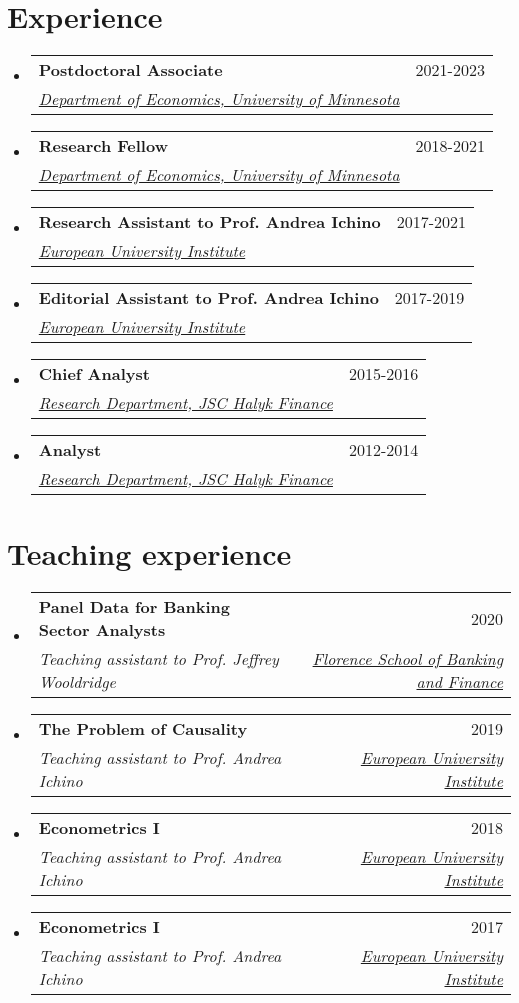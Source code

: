 \documentclass[a4, 11pt]{article}
\makeatletter
\newcommand{\resumeSubheading}[4]{
      \vspace{-2pt}\item
        \begin{tabular*}{0.97\textwidth}[t]{l@{\extracolsep{\fill}}r}
          \textbf{#1} & #2 \\
          \textit{\small#3} & \textit{\small #4} \\
        \end{tabular*}
    }
\newcommand{\resumeSubHeadingListStart}{\begin{itemize}[leftmargin=0.15in, label={}]}
\newcommand{\resumeSubHeadingListEnd}{\end{itemize}}
\makeatother
\begin{document}
    \section{Experience}
  \resumeSubHeadingListStart
        \resumeSubheading
          {Postdoctoral Associate}
          {2021-2023}
          {\href{https://cla.umn.edu/economics}{Department of Economics, University of Minnesota} }
          {}
        \resumeSubheading
          {Research Fellow}
          {2018-2021}
          {\href{https://cla.umn.edu/economics}{Department of Economics, University of Minnesota} }
          {}
        \resumeSubheading
          {Research Assistant to Prof. Andrea Ichino}
          {2017-2021}
          {\href{https://www.eui.eu}{European University Institute} }
          {}
        \resumeSubheading
          {Editorial Assistant to Prof. Andrea Ichino}
          {2017-2019}
          {\href{https://www.eui.eu}{European University Institute} }
          {}
        \resumeSubheading
          {Chief Analyst}
          {2015-2016}
          {\href{https://www.halykfinance.kz}{Research Department, JSC Halyk Finance} }
          {}
        \resumeSubheading
          {Analyst}
          {2012-2014}
          {\href{https://www.halykfinance.kz}{Research Department, JSC Halyk Finance} }
          {}
    \resumeSubHeadingListEnd


    \section{Teaching experience}
  \resumeSubHeadingListStart
        \resumeSubheading
          {Panel Data for Banking Sector Analysts}
          {2020}
          {Teaching assistant to Prof. Jeffrey Wooldridge}
          { \href{https://www.fbf.eui.eu}{Florence School of Banking and Finance} }
        \resumeSubheading
          {The Problem of Causality}
          {2019}
          {Teaching assistant to Prof. Andrea Ichino}
          { \href{https://www.eui.eu}{European University Institute} }
        \resumeSubheading
          {Econometrics I}
          {2018}
          {Teaching assistant to Prof. Andrea Ichino}
          { \href{https://www.eui.eu}{European University Institute} }
        \resumeSubheading
          {Econometrics I}
          {2017}
          {Teaching assistant to Prof. Andrea Ichino}
          { \href{https://www.eui.eu}{European University Institute} }
    \resumeSubHeadingListEnd


\end{document}
